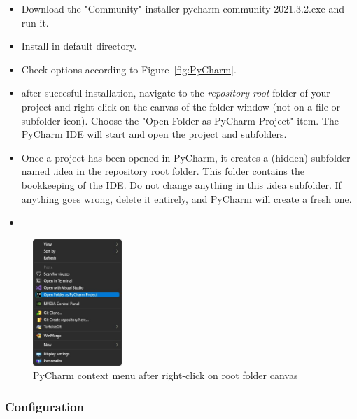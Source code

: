 \begin{itemize}
	\item Download the "Community" installer \textsf{pycharm-community-2021.3.2.exe} and run it.
	\item Install in default directory.
	\item Check options according to Figure~\ref{fig:PyCharm}.
	\item after succesful installation, navigate to the \emph{repository root} folder of your project and right-click on the canvas of the folder window (not on a file or subfolder icon). Choose the "Open Folder as PyCharm Project" item. The PyCharm IDE will start and open the project and subfolders.
	\item Once a project has been opened in PyCharm, it creates a (hidden) subfolder named \textsf{.idea} in the repository root folder. This folder contains the bookkeeping of the IDE. Do not change anything in this \textsf{.idea} subfolder. If anything goes wrong, delete it entirely, and PyCharm will create a fresh one.
	\item 
\end{itemize}

\begin{figure}[H]
	\centering
	\includegraphics[width=0.3\textwidth]{Figures/context_menu_pycharm.jpg}
	\caption{PyCharm context menu after right-click on root folder canvas}
	\label{fig:contextmenu_pycharm}
\end{figure}

\subsubsection{Configuration}

